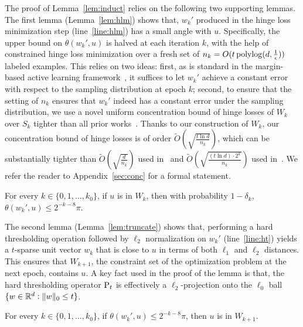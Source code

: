 The proof of Lemma~\ref{lem:induct} relies on the following two supporting lemmas. The first lemma (Lemma~\ref{lem:hlm}) shows that, $w_k'$ produced in the hinge loss minimization step (line~\ref{line:hlm}) has a small angle with $u$. Specifically, the upper bound on $\theta(w_k',u)$
is halved at each iteration $k$, with the help of constrained hinge loss minimization over a fresh set of $n_k = O(t \operatorname{polylog}(d,\frac1\epsilon))$ labeled examples. This relies on two ideas: first, as is standard
in the margin-based active learning framework~\citep[See e.g.][]{BBZ07,BL13}, it suffices to let $w_k'$ achieve a constant error with respect to the sampling distribution at epoch $k$; second, to ensure that the setting of $n_k$ ensures that $w_k'$ indeed has a constant error under the sampling distribution, we use a novel uniform concentration bound of hinge losses of $W_k$ over $S_k$ tighter than all prior works~\citep{ABL17,ABHZ16}. Thanks to our construction of $W_k$, our concentration bound of hinge losses is of order $\tilde{O}(\sqrt{\frac{t\ln d}{n_k}})$, which can be substantially tighter than
$\tilde{O}(\sqrt{\frac{d}{n_k}})$ used in~\citet{ABL17,HKY15} and $\tilde{O}(\sqrt{\frac{(t \ln d) \cdot 2^k}{n_k}})$ used in~\citet{ABHZ16}. We refer the reader to Appendix~\ref{sec:conc} for a formal statement.


\begin{lemma}
For every $k \in \{ 0, 1,\ldots,k_0 \}$, if $u$ is in $W_k$, then with probability $1-\delta_k$, $\theta(w_k', u) \leq 2^{-k-8} \pi$.
\label{lem:hlm}
\end{lemma}

The second lemma (Lemma~\ref{lem:truncate}) shows that, performing a hard thresholding operation followed by $\ell_2$ normalization on $w_k'$ (line~\ref{line:ht}) yields a $t$-sparse unit vector $w_k$ that is close to $u$ in terms of both $\ell_1$ and $\ell_2$ distances. This ensures that $W_{k+1}$, the constraint set of the optimization problem at the next epoch, contains $u$. A key fact used in the proof of the lemma is that, the hard thresholding operator $\operatorname{P}_t$ is effectively a $\ell_2$-projection onto the $\ell_0$ ball $\{w \in \mathbb{R}^d: \| w \|_0 \leq t \}$.


\begin{lemma}
For every $k \in \{ 0,1,\ldots,k_0 \}$, if $\theta(w_k', u) \leq 2^{-k-8} \pi$, then $u$ is in $W_{k+1}$.
\label{lem:truncate}
\end{lemma}

